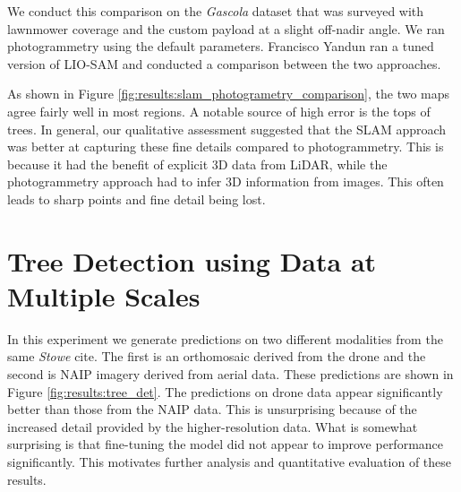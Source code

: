 We conduct this comparison on the \textit{Gascola} dataset that was surveyed with lawnmower coverage and the custom payload at a slight off-nadir angle. We ran photogrammetry using the default parameters. Francisco Yandun ran a tuned version of LIO-SAM and conducted a comparison between the two approaches.

As shown in Figure \ref{fig:results:slam_photogrametry_comparison}, the two maps agree fairly well in most regions. A notable source of high error is the tops of trees. In general, our qualitative assessment suggested that the SLAM approach was better at capturing these fine details compared to photogrammetry. This is because it had the benefit of explicit 3D data from LiDAR, while the photogrammetry approach had to infer 3D information from images. This often leads to sharp points and fine detail being lost.

\section{Tree Detection using Data at Multiple Scales}
In this experiment we generate predictions on two different modalities from the same \textit{Stowe} cite. The first is an orthomosaic derived from the drone and the second is NAIP imagery derived from aerial data. These predictions are shown in Figure \ref{fig:results:tree_det}. 
The predictions on drone data appear significantly better than those from the NAIP data. This is unsurprising because of the increased detail provided by the higher-resolution data. What is somewhat surprising is that fine-tuning the model did not appear to improve performance significantly. This motivates further analysis and quantitative evaluation of these results.


